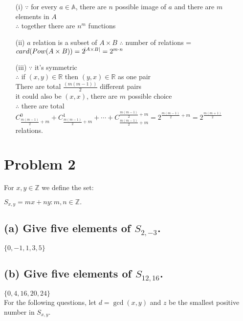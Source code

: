 \documentclass{article}
\begin{document}
\begin{itemize}

\item[(i)] $\because$ for every $a \in \mathbb{A}$, there are $n$ possible image of $a$ and there are $m$ elements in $A$\\
      $\therefore$ together there are $n^m$ functions

\item[(ii)] $a$ relation is a subset of $A \times B$
      $\therefore$ number of relations = $card(Pow(A \times B)) = 2^{\abs{A \times B}} = 2^{m \cdot n}$

\item[(iii)] $\because$ it’s symmetric\\
      $\therefore$ if $(x,y) \in \mathbb{R}$ then $(y,x) \in \mathbb{R}$ as one pair\\
      There are total $\frac{(m(m-1))}{2}$ different pairs\\
      it could also be $(x, x)$, there are $m$ possible choice\\
    $\therefore$ there are total $C_{\frac{m(m-1)}{2}+m}^{0} + C_{\frac{m(m-1)}{2}+m}^{1} + \cdots + C_{\frac{m(m-1)}{2}+m}^{\frac{m(m-1)}{2}+m} = 2^{\frac{m(m-1)}{2}+m} = 2^{\frac{m(m+1)}{2}}$ relations.

\end{itemize}

\section*{Problem 2}
For $x,y \in \mathbb{Z}$  we define the set:
\begin{center}
$S_{x,y} ={mx+ny:m,n \in \mathbb{Z}}.$
\end{center}

\subsection*{(a) Give five elements of $S_{2,-3}$.}
\indent$\{0, -1, 1, 3, 5\}$

\subsection*{(b) Give five elements of $S_{12,16}$.}
\indent$\{0, 4, 16, 20, 24\}$\\

\indent For the following questions, let $d = \gcd(x, y)$ and $z$ be the smallest positive number in $S_{x,y}$.
\end{document}
